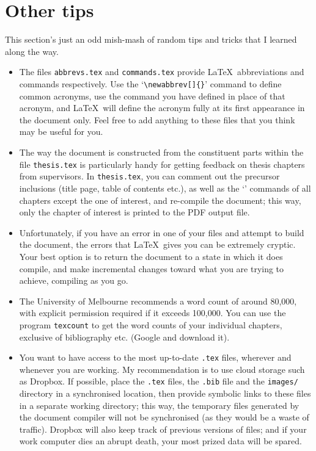 \section{Other tips}

This section's just an odd mish-mash of random tips and tricks that I learned along the way.

\begin{itemize}

\item The files \verb+abbrevs.tex+ and \verb+commands.tex+ provide \LaTeX~abbreviations and commands respectively. Use the `\verb+\newabbrev[]{}+' command to define common acronyms, use the command you have defined in place of that acronym, and \LaTeX~will define the acronym fully at its first appearance in the document only. Feel free to add anything to these files that you think may be useful for you.

\item The way the document is constructed from the constituent parts within the file \verb+thesis.tex+ is particularly handy for getting feedback on thesis chapters from supervisors. In \verb+thesis.tex+, you can comment out the precursor inclusions (title page, table of contents etc.), as well as the `\verb++' commands of all chapters except the one of interest, and re-compile the document; this way, only the chapter of interest is printed to the PDF output file.

\item Unfortunately, if you have an error in one of your files and attempt to build the document, the errors that \LaTeX~gives you can be extremely cryptic. Your best option is to return the document to a state in which it does compile, and make incremental changes toward what you are trying to achieve, compiling as you go.

\item The University of Melbourne recommends a word count of around 80,000, with explicit permission required if it exceeds 100,000. You can use the program \verb+texcount+ to get the word counts of your individual chapters, exclusive of bibliography etc. (Google and download it).

\item You want to have access to the most up-to-date \verb+.tex+ files, wherever and whenever you are working. My recommendation is to use cloud storage such as Dropbox. If possible, place the \verb+.tex+ files, the \verb+.bib+ file and the \verb+images/+ directory in a synchronised location, then provide symbolic links to these files in a separate working directory; this way, the temporary files generated by the document compiler will not be synchronised (as they would be a waste of traffic). Dropbox will also keep track of previous versions of files; and if your work computer dies an abrupt death, your most prized data will be spared.


\end{itemize}
